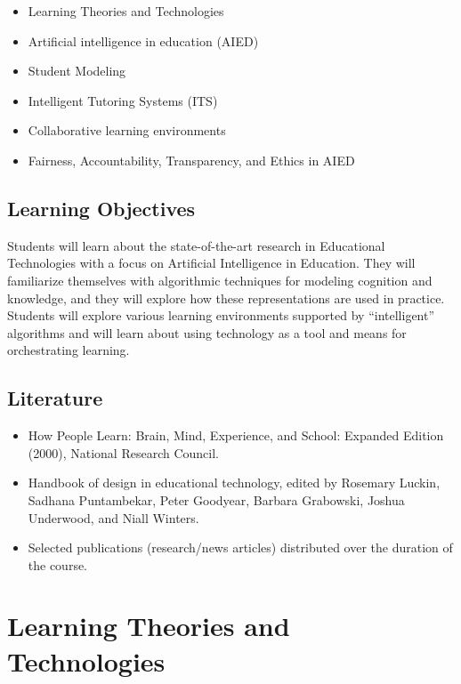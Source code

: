 \documentclass[
]{book}
\providecommand{\tightlist}{%
  \setlength{\itemsep}{0pt}\setlength{\parskip}{0pt}}
\begin{document}
\begin{itemize}
\tightlist
\item
  Learning Theories and Technologies
\item
  Artificial intelligence in education (AIED)
\item
  Student Modeling
\item
  Intelligent Tutoring Systems (ITS)
\item
  Collaborative learning environments
\item
  Fairness, Accountability, Transparency, and Ethics in AIED
\end{itemize}

\section{\texorpdfstring{\textbf{Learning Objectives}}{Learning Objectives}}\label{learning-objectives}

Students will learn about the state-of-the-art research in Educational Technologies with a focus on Artificial Intelligence in Education. They will familiarize themselves with algorithmic techniques for modeling cognition and knowledge, and they will explore how these representations are used in practice. Students will explore various learning environments supported by ``intelligent'' algorithms and will learn about using technology as a tool and means for orchestrating learning.

\section{\texorpdfstring{\textbf{Literature}}{Literature}}\label{literature}

\begin{itemize}
\tightlist
\item
  How People Learn: Brain, Mind, Experience, and School: Expanded Edition (2000), National Research Council. \citep{howpeoplelearn}\\
\item
  Handbook of design in educational technology, edited by Rosemary Luckin, Sadhana Puntambekar, Peter Goodyear, Barbara Grabowski, Joshua Underwood, and Niall Winters. \citep{handbookedtech}\\
\item
  Selected publications (research/news articles) distributed over the duration of the course.
\end{itemize}

\chapter{Learning Theories and Technologies}\label{learningtheories}
\end{document}
